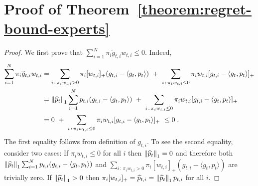 \section{Proof of Theorem~\ref{theorem:regret-bound-experts}}
\label{section:appendix-expert-reduction}

\begin{proof}
We first prove that $\sum_{i=1}^N \pi_i \widetilde g_{t,i} w_{t,i} \le 0$. Indeed,
\begin{align*}
\sum_{i=1}^N \pi_i \widetilde g_{t,i} w_{t,i}
& = \sum_{i \, : \, \pi_i w_{t,i} > 0} \pi_i [w_{t,i}]_+ (g_{t,i} - \langle g_t, p_t \rangle)  \ + \ \sum_{i \, : \, \pi_i w_{t,i} \le 0} \pi_i w_{t,i} [g_{t,i} - \langle g_t, p_t \rangle ]_+ \\
& = \left\|{\widehat p_t}\right\|_1 \sum_{i=1}^N p_{t,i} (g_{t,i} - \langle g_t, p_t \rangle)  \ + \ \sum_{i \, : \, \pi_i w_{t,i} \le 0} \pi_i w_{t,i} [g_{t,i} - \langle g_t, p_t\rangle]_+ \\
& = 0 \ + \ \sum_{i \, : \, \pi_i w_{t,i} \le 0} \pi_i w_{t,i} [g_{t,i} - \langle g_t, p_t\rangle]_+
\ \le 0 \; .
\end{align*}
The first equality follows from definition of $g_{t,i}$. To see the second
equality, consider two cases: If $\pi_i w_{t,i} \le 0$ for all $i$ then
$\left\|{\widehat p_t}\right\|_1 = 0$ and therefore both
$\left\|{\widehat p_t}\right\|_1 \sum_{i=1}^N p_{t,i} (g_{t,i} - \langle g_t, p_t \rangle)$
and $\sum_{i \, : \, \pi_i w_{t,i} > 0} \pi_i [w_{t,i}]_+
(g_{t,i} - \langle g_t, p_t \rangle)$ are trivially zero.  If $\left\|{\widehat p_t}\right\|_1 >
0$ then $\pi_i [w_{t,i}]_+ = \widehat p_{t,i} = \left\|{\widehat p_t}\right\|_1 p_{t,i}$
for all $i$.


\end{proof}
